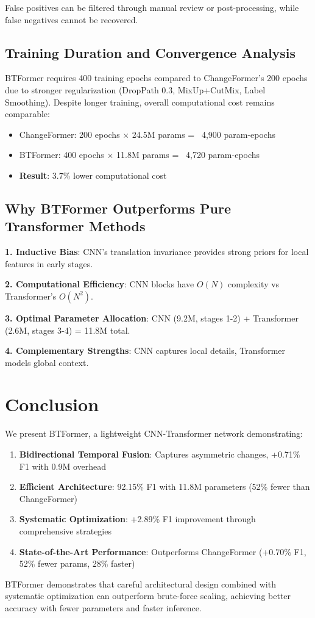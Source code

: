 \documentclass[journal]{IEEEtran}
\begin{document}
False positives can be filtered through manual review or post-processing, while false negatives cannot be recovered.

\subsection{Training Duration and Convergence Analysis}

BTFormer requires 400 training epochs compared to ChangeFormer's 200 epochs due to stronger regularization (DropPath 0.3, MixUp+CutMix, Label Smoothing). Despite longer training, overall computational cost remains comparable:
\begin{itemize}
\item ChangeFormer: 200 epochs × 24.5M params = ~4,900 param-epochs
\item BTFormer: 400 epochs × 11.8M params = ~4,720 param-epochs
\item \textbf{Result}: 3.7\% lower computational cost
\end{itemize}

\subsection{Why BTFormer Outperforms Pure Transformer Methods}

\textbf{1. Inductive Bias}: CNN's translation invariance provides strong priors for local features in early stages.

\textbf{2. Computational Efficiency}: CNN blocks have $O(N)$ complexity vs Transformer's $O(N^2)$.

\textbf{3. Optimal Parameter Allocation}: CNN (9.2M, stages 1-2) + Transformer (2.6M, stages 3-4) = 11.8M total.

\textbf{4. Complementary Strengths}: CNN captures local details, Transformer models global context.

\section{Conclusion}

We present BTFormer, a lightweight CNN-Transformer network demonstrating:
\begin{enumerate}
\item \textbf{Bidirectional Temporal Fusion}: Captures asymmetric changes, +0.71\% F1 with 0.9M overhead
\item \textbf{Efficient Architecture}: 92.15\% F1 with 11.8M parameters (52\% fewer than ChangeFormer)
\item \textbf{Systematic Optimization}: +2.89\% F1 improvement through comprehensive strategies
\item \textbf{State-of-the-Art Performance}: Outperforms ChangeFormer (+0.70\% F1, 52\% fewer params, 28\% faster)
\end{enumerate}

BTFormer demonstrates that careful architectural design combined with systematic optimization can outperform brute-force scaling, achieving better accuracy with fewer parameters and faster inference.



\end{document}
